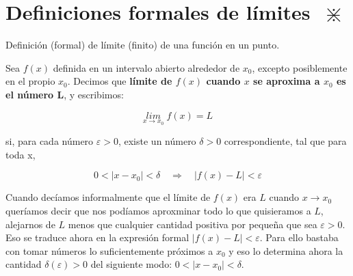 	\section{Definiciones formales de límites $\; \divideontimes$ }
	
	
	\begin{defi} \label{defi:limite} Definición (formal) de límite (finito) de una función en un punto.
	
	Sea $f(x)$ definida en un intervalo abierto alrededor de $x_0$, excepto posiblemente en el propio $x_0$. Decimos que	\textbf{límite de $f(x)$ cuando $x$ se aproxima a $x_0$ es el número L}, y escribimos:
	
	\begin{equation*}
		\underset {x\to x_0}{lim}\; {f(x)}=L
	\end{equation*}
	
	si, para cada número $\varepsilon >0$, existe un número $\delta > 0$ correspondiente, tal que para toda x,
	
	\begin{equation*}
		0<|x-x_0|<\delta \quad \Rightarrow \quad |f(x)-L|<\varepsilon
	\end{equation*}
	\end{defi}

	Cuando decíamos informalmente que el límite de $f(x)$ era $L$ cuando $x \to x_0$ queríamos decir que nos podíamos aproxminar todo lo que quisieramos a $L$, alejarnos de $L$ menos que cualquier cantidad positiva por pequeña que sea $\varepsilon>0$. Eso se traduce ahora en la expresión formal $|f(x)-L|<\varepsilon$. Para ello bastaba con tomar números lo suficientemente próximos a $x_0$ y eso lo determina ahora la cantidad $\delta(\varepsilon)>0$ del siguiente modo: $0<|x-x_0|<\delta$.
	
	
		
